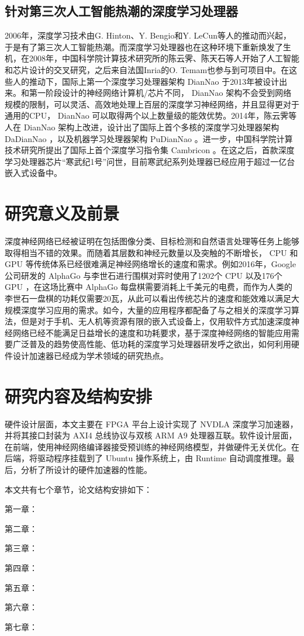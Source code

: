 \subsection{针对第三次人工智能热潮的深度学习处理器}
2006年，深度学习技术由G. Hinton、Y. Bengio和Y. LeCun等人的推动而兴起，于是有了第三次人工智能热潮。而深度学习处理器也在这种环境下重新焕发了生机，在2008年，中国科学院计算技术研究所的陈云霁、陈天石等人开始了人工智能和芯片设计的交叉研究，之后来自法国Inria的O. Temam也参与到可项目中。在这些人的推动下，国际上第一个深度学习处理器架构 DianNao 于2013年被设计出来。和第一阶段设计的神经网络计算机/芯片不同， DianNao 架构不会受到网络规模的限制，可以灵活、高效地处理上百层的深度学习神经网络，并且显得更对于通用的CPU， DianNao\cite{10.1145/2654822.2541967} 可以取得两个以上数量级的能效优势。2014年，陈云霁等人在 DianNao 架构上改进，设计出了国际上首个多核的深度学习处理器架构 DaDianNao\cite{7011421} ，以及机器学习处理器架构 PuDianNao \cite{10.1145/2786763.2694358} 。进一步，中国科学院计算技术研究所提出了国际上首个深度学习指令集 Cambricon\cite{7551409} 。在这之后，首款深度学习处理器芯片“寒武纪1号”问世，目前寒武纪系列处理器已经应用于超过一亿台嵌入式设备中。

\section{研究意义及前景}

深度神经网络已经被证明在包括图像分类、目标检测和自然语言处理等任务上能够取得相当不错的效果。而随着其层数和神经元数量以及突触的不断增长， CPU 和 GPU 等传统体系已经很难满足神经网络增长的速度和需求。例如2016年，Google公司研发的 AlphaGo 与李世石进行围棋对弈时使用了1202个 CPU 以及176个 GPU ，在这场比赛中 AlphaGo 每盘棋需要消耗上千美元的电费，而作为人类的李世石一盘棋的功耗仅需要20瓦，从此可以看出传统芯片的速度和能效难以满足大规模深度学习应用的需求。如今，大量的应用程序都配备了与之相关的深度学习算法，但是对于手机、无人机等资源有限的嵌入式设备上，仅用软件方式加速深度神经网络已经不能满足日益增长的速度和功耗要求，基于深度神经网络的智能应用需要广泛普及的趋势使高性能、低功耗的深度学习处理器研发呼之欲出，如何利用硬件设计加速器已经成为学术领域的研究热点。

\section{研究内容及结构安排}

硬件设计层面，本文主要在 FPGA 平台上设计实现了 NVDLA 深度学习加速器，并将其接口封装为 AXI4 总线协议与双核 ARM A9 处理器互联。软件设计层面，在前端，使用神经网络编译器接受预训练的神经网络模型，并做硬件无关优化。在后端，将驱动程序挂载到了 Ubuntu 操作系统上，由 Runtime 自动调度推理。最后，分析了所设计的硬件加速器的性能。

本文共有七个章节，论文结构安排如下：

第一章：

第二章：

第三章：

第四章：

第五章：

第六章：

第七章：




